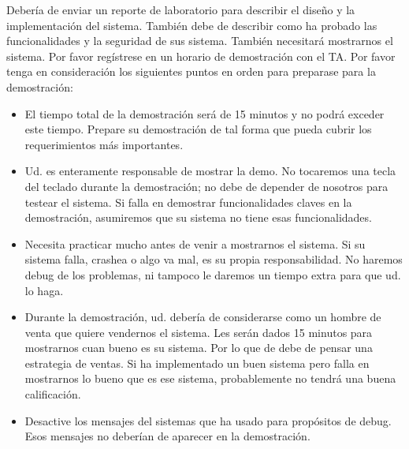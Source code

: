 


Debería de enviar un reporte de laboratorio para describir el diseño y la implementación del sistema.
También debe de describir como ha probado las funcionalidades y la seguridad de sus sistema. También necesitará mostrarnos el sistema.
Por favor regístrese en un horario de demostración con el TA. Por favor tenga en consideración los siguientes puntos en orden para preparase para la demostración:

\begin{itemize}

\item El tiempo total de la demostración será de 15 minutos y no podrá exceder este tiempo. Prepare su demostración de tal forma que pueda cubrir los requerimientos más importantes.

\item Ud. es enteramente responsable de mostrar la demo. No tocaremos una tecla del teclado durante la demostración; no debe de depender de nosotros para testear el sistema. Si falla en demostrar funcionalidades claves en la demostración, asumiremos que su sistema no tiene esas funcionalidades.

\item Necesita practicar mucho antes de venir a mostrarnos el sistema. Si su sistema falla, crashea o algo va mal, es su propia responsabilidad. No haremos debug de los problemas, ni tampoco le daremos un tiempo extra para que ud. lo haga.

\item Durante la demostración, ud. debería de considerarse como un hombre de venta que quiere vendernos el sistema. Les serán dados 15 minutos para mostrarnos cuan bueno es su sistema.
Por lo que de debe de pensar una estrategia de ventas. Si ha implementado un buen sistema pero falla en mostrarnos lo bueno que es ese sistema, probablemente no tendrá una buena calificación.

\item Desactive los mensajes del sistemas que ha usado para propósitos de debug. Esos mensajes no deberían de aparecer en la demostración.


\end{itemize}


